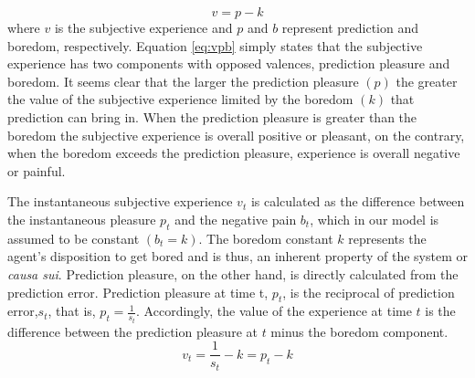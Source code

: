 \documentclass[11pt,twocolumn]{article}
\begin{document}
\begin{equation}
    v =  p - k
\label{eq:vpb}
\end{equation}
where $v$ is the subjective experience and $p$ and $b$ represent prediction and boredom, respectively. 
Equation \ref{eq:vpb} simply states that the subjective experience has two components with opposed valences, prediction pleasure and boredom. It seems clear that the larger the prediction pleasure $(p)$ the greater the value of the subjective experience limited by the boredom $(k)$ that prediction can bring in.  
When the prediction pleasure is greater than the boredom the subjective experience is overall positive or pleasant, on the contrary, when the boredom exceeds the prediction pleasure, experience is overall negative or painful. 

The instantaneous subjective experience $v_t$ is calculated as the difference between the instantaneous pleasure $p_t$ and the negative pain $b_t$, which in our model is assumed to be constant $(b_t=k)$. The boredom constant $k$ represents the agent's disposition to get bored and is thus, an inherent property of the system or \emph{causa sui}. Prediction pleasure, on the other hand, is directly calculated from the prediction error.
Prediction pleasure at time t, $p_t$, is the reciprocal of prediction error,$s_t$, that is, $p_t = \frac{1}{s_t}$.
Accordingly, the value of the experience at time $t$ is the difference between the prediction pleasure at $t$ minus the boredom component.
\begin{equation}
    v_t = \frac{1}{s_t} -k = p_t - k
\label{eq:vpbt}
\end{equation}
\end{document}

